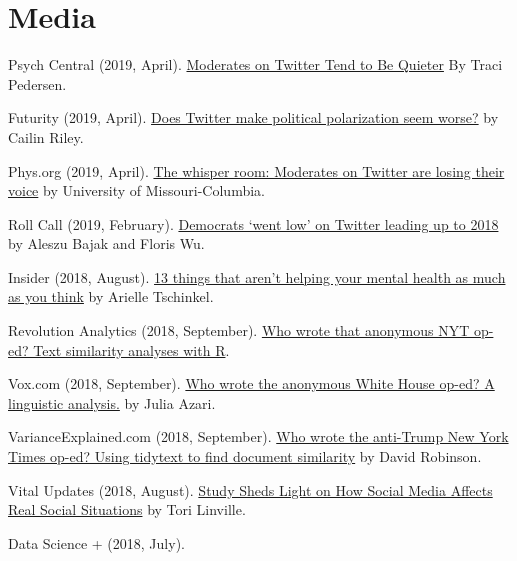 \section{Media}
  \begin{bibenum}
    \item[] Psych Central (2019, April).
      \href{https://psychcentral.com/news/2019/04/07/moderates-on-twitter-tend-to-be-quieter/144320.html}{Moderates on Twitter Tend to Be Quieter} By Traci Pedersen.
    \item[] Futurity (2019, April).
      \href{https://www.futurity.org/political-polarization-twitter-moderates-2025862/}{Does Twitter make political polarization seem worse?} by Cailin Riley.
    \item[] Phys.org (2019, April).
      \href{https://phys.org/news/2019-04-room-moderates-twitter-voice.html}{The whisper room: Moderates on Twitter are losing their voice} by University of Missouri-Columbia.
    \item[] Roll Call (2019, February).
      \href{https://www.rollcall.com/news/lead-midterms-twitter-republicans-went-high-democrats-went-low}{Democrats ‘went low’ on Twitter leading up to 2018} by Aleszu Bajak and Floris Wu.
    \item[] Insider (2018, August).
      \href{https://www.thisisinsider.com/things-that-are-not-helping-your-mental-health-2018-9}{13 things that aren't helping your mental health as much as you think} by Arielle Tschinkel.
    \item[] Revolution Analytics (2018, September).
      \href{http://blog.revolutionanalytics.com/2018/09/anonymous-nyt-op-ed.html}{Who wrote that anonymous NYT op-ed? Text similarity analyses with R}.
    \item[] Vox.com (2018, September).
      \href{https://www.vox.com/mischiefs-of-faction/2018/9/7/17830304/who-wrote-anonymous-white-house-op-ed}{Who wrote the anonymous White House op-ed? A linguistic analysis.} by Julia Azari.
    \item[] VarianceExplained.com (2018, September).
      \href{http://varianceexplained.org/r/op-ed-text-analysis/}{Who wrote the anti-Trump New York Times op-ed? Using tidytext to find document similarity} by David Robinson.
    \item[] Vital Updates (2018, August).
      \href{https://vitalupdates.com/study-sheds-light-on-how-social-media-affects-real-social-situations/}{Study Sheds Light on How Social Media Affects Real Social Situations} by Tori Linville.
    \item[] Data Science {+} (2018, July).

\end{bibenum}
